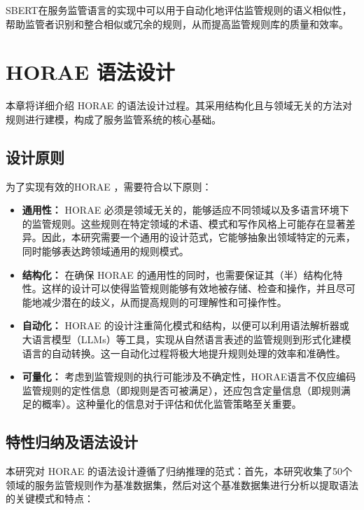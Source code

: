 SBERT在服务监管语言的实现中可以用于自动化地评估监管规则的语义相似性，帮助监管者识别和整合相似或冗余的规则，从而提高监管规则库的质量和效率。

\newpage

\section{HORAE 语法设计}

本章将详细介绍 HORAE 的语法设计过程。其采用结构化且与领域无关的方法对规则进行建模，构成了服务监管系统的核心基础。

\subsection{设计原则}

为了实现有效的HORAE ，需要符合以下原则：

\begin{itemize}
    \item \textbf{通用性：} HORAE 必须是领域无关的，能够适应不同领域以及多语言环境下的监管规则。这些规则在特定领域的术语、模式和写作风格上可能存在显著差异。因此，本研究需要一个通用的设计范式，它能够抽象出领域特定的元素，同时能够表达跨领域通用的规则模式。
    \item \textbf{结构化：} 在确保 HORAE 的通用性的同时，也需要保证其（半）结构化特性。这样的设计可以使得监管规则能够有效地被存储、检查和操作，并且尽可能地减少潜在的歧义，从而提高规则的可理解性和可操作性。
    \item \textbf{自动化：} HORAE 的设计注重简化模式和结构，以便可以利用语法解析器或大语言模型（LLMs）等工具，实现从自然语言表述的监管规则到形式化建模语言的自动转换。这一自动化过程将极大地提升规则处理的效率和准确性。
    \item \textbf{可量化：} 考虑到监管规则的执行可能涉及不确定性，HORAE语言不仅应编码监管规则的定性信息（即规则是否可被满足），还应包含定量信息（即规则满足的概率）。这种量化的信息对于评估和优化监管策略至关重要。
\end{itemize}

\subsection{特性归纳及语法设计}

本研究对 HORAE 的语法设计遵循了归纳推理的范式：首先，本研究收集了50个领域的服务监管规则作为基准数据集，然后对这个基准数据集进行分析以提取语法的关键模式和特点：


